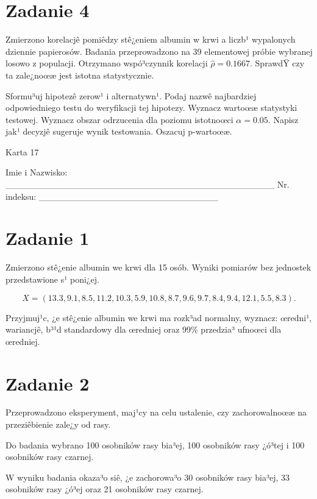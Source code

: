 \documentclass[a4paper,12pt]{article}
\begin{document}
  \section*{Zadanie 4}
     
     Zmierzono korelacjê pomiêdzy stê¿eniem albumin w krwi a liczb¹ wypalonych dziennie papierosów. 
     Badania przeprowadzono na 39 elementowej próbie wybranej losowo z populacji. 
     Otrzymano wspó³czynnik korelacji $\hat\rho = 0.1667 $. 
     SprawdŸ czy ta zale¿noœæ jest istotna statystycznie. 
     
     Sformu³uj hipotezê zerow¹ i alternatywn¹. 
     Podaj nazwê najbardziej odpowiedniego testu do weryfikacji tej hipotezy. 
     Wyznacz wartoœæ statystyki testowej. 
     Wyznacz obszar odrzucenia dla poziomu istotnoœci $\alpha=0.05$. 
     Napisz jak¹ decyzjê sugeruje wynik testowania. 
     Oszacuj p-wartoœæ. \vspace{1cm} 

  \clearpage  Karta  17  

 Imie i Nazwisko: \_\_\_\_\_\_\_\_\_\_\_\_\_\_\_\_\_\_\_\_\_\_\_\_\_\_\_\_\_\_\_\_\_\_\_\_\_\_\_\_\_\_ Nr. indeksu: \_\_\_\_\_\_\_\_\_\_\_\_\_\_\_\_\_\_\_\_\_\_\_\_\_\_\_\_ 
 \section*{Zadanie 1}
     
     Zmierzono stê¿enie albumin we krwi dla 15 osób. 
     Wyniki pomiarów bez jednostek przedstawione s¹ poni¿ej. 
     
     \noindent $$X=( 13.3,  9.1,  8.5, 11.2, 10.3,  5.9, 10.8,  8.7,  9.6,  9.7,  8.4,  9.4, 12.1,  5.5,  8.3 ).$$
     
     Przyjmuj¹c, ¿e stê¿enie albumin we krwi ma rozk³ad normalny, 
     wyznacz: œredni¹, wariancjê, b³¹d standardowy dla œredniej oraz 99\% przedzia³ ufnoœci dla œredniej. \vspace{1cm} 

  \section*{Zadanie 2}
     
  Przeprowadzono eksperyment, maj¹cy na celu ustalenie, czy zachorowalnoœæ na przeziêbienie zale¿y od rasy.
  
  Do badania wybrano 100 osobników rasy bia³ej, 100 osobników rasy ¿ó³tej i 100 osobników rasy czarnej. 
  
  W wyniku badania okaza³o siê, ¿e zachorowa³o 30 osobników rasy bia³ej, 33 osobników rasy ¿ó³ej oraz 21 osobników rasy czarnej. 
  
\end{document}
